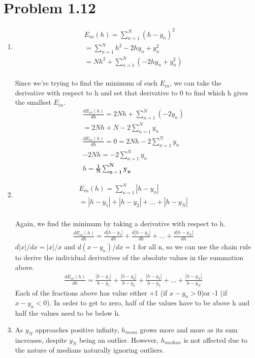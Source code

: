 \documentclass[12pt]{article}
\begin{document}
\section*{Problem 1.12}
\begin{enumerate}[label=(\alph*)]
	\item
	\begin{gather*}
		E_{in}(h) = \sum_{n=1}^{N}(h - y_n)^2
		\\ = \sum_{n=1}^{N}h^2 - 2hy_n + y_n^2 
		\\ = Nh^2 + \sum_{n=1}^{N}(-2hy_n + y_n^2)
	\end{gather*}
	\\ Since we're trying to find the minimum of such $E_{in}$, we can take the derivative with respect to h and set that derivative to 0 to find which h gives the smallest $E_{in}$.
	\begin{gather*}
		\frac{dE_{in}(h)}{dh} = 2Nh + \sum_{n=1}^{N}(-2y_n)
		\\ = 2Nh + N - 2\sum_{n=1}^{N}y_n
		\\ \frac{dE_{in}(h)}{dh} = 0 = 2Nh - 2\sum_{n=1}^{N}y_n
		\\ -2Nh = -2\sum_{n=1}^{N}y_n
		\\ h = \boldsymbol{\frac{1}{N}\sum_{n=1}^{N}y_n}
	\end{gather*}
	\item 
	\begin{gather*}
		E_{in}(h) = \sum_{n=1}^{N}|h - y_n|
		\\ = |h - y_1| + |h - y_2| + ... + |h - y_N|
	\end{gather*}
	\\ Again, we find the minimum by taking a derivative with respect to h.
	\begin{gather*}
		\frac{dE_{in}(h)}{dh} = \frac{d|h - y_1|}{dh} + \frac{d|h - y_2|}{dh} + ... + \frac{d|h - y_N|}{dh}
	\end{gather*}
	$d|x|/dx = |x|/x$ and $d(x - y_n)/dx = 1$ for all n, so we can use the chain rule to derive the individual derivatives of the absolute values in the summation above.
	\begin{gather*}
		\frac{dE_{in}(h)}{dh} = \frac{|h - y_1|}{h - y_1} + \frac{|h - y_2|}{h - y_2} + \frac{|h - y_3|}{h - y_3} + ... + \frac{|h - y_N|}{h - y_N}
	\end{gather*}
	Each of the fractions above has value either +1 (if $x - y_n > 0$)or -1 (if $x - y_n < 0$). In order to get to zero, half of the values have to be above h and half the values need to be below h.
	\item As $y_N$ approaches positive infinity, $h_{mean}$ grows more and more as its sum increases, despite $y_N$ being an outlier. However, $h_{median}$ is not affected due to the nature of medians naturally ignoring outliers.
\end{enumerate}
\end{document}
